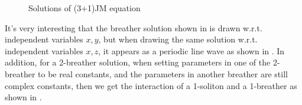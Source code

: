 \begin{figure}
{}
\caption{Solutions of (3+1)JM equation}
\label{jm}
\end{figure}

It's very interesting that the breather solution shown in  is drawn w.r.t. independent variables $x,y$, but when drawing the same solution w.r.t. independent variables $x,z$, it appears as a periodic line wave as shown in . In addition, for a 2-breather solution, when setting parameters in one of the 2-breather to be real constants, and the parameters in another breather are still complex constants, then we get the interaction of a 1-soliton and a 1-breather as shown in . 

